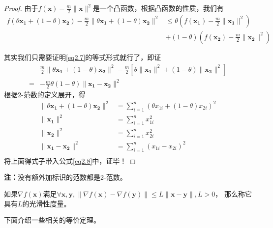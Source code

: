 \documentclass[lang=cn,10pt]{elegantbook}
\newcommand\bv[1]{\boldsymbol{#1}}
\begin{document}
\begin{proof}
	由于$f(\bv{x})-\frac{m}{2} \|\bv{x}\|^2$是一个凸函数，根据凸函数的性质，我们有
	\begin{equation}\label{eq2.6}
		\begin{aligned}
			f(\theta \bv{x_1}+(1-\theta)\bv{x_2})-\frac{m}{2} \|\theta \bv{x_1}+(1-\theta)\bv{x_2}\|^2 & \leq \theta (f(\bv{x_1})-\frac{m}{2} \|\bv{x_1}\|^2) \\
			                                                                                           & + (1-\theta)(f(\bv{x_2})-\frac{m}{2} \|\bv{x_2}\|^2)
		\end{aligned}
	\end{equation}

	其实我们只需要证明\ref{eq2.7}的等式形式就行了，即证
	\begin{equation} \label{eq2.8}
		\begin{aligned}
			  & \frac{m}{2} \|\theta \bv{x_1}+(1-\theta)\bv{x_2}\|^2 - \frac{m}{2}[\theta \|\bv{x_1}\|^2 + (1-\theta)\|\bv{x_2}\|^2] \\
			= & -\frac{m}{2}\theta(1-\theta)\|\bv{x_1-x_2}\|^2
		\end{aligned}
	\end{equation}
	根据2-范数的定义展开，得
	\begin{equation*}
		\begin{aligned}
			\|\theta \bv{x_1}+(1-\theta)\bv{x_2}\|^2 & = \sum_{i=1}^n (\theta x_{1i}+(1-\theta)x_{2i})^2 \\
			\|\bv{x_1}\|^2                           & =\sum_{i=1}^n x_{1i}^2                            \\
			\|\bv{x_2}\|^2                           & =\sum_{i=1}^n x_{2i}^2                            \\
			\|\bv{x_1}-\bv{x_2}\|^2                  & =\sum_{i=1}^n (x_{1i}-x_{2i})^2                   \\
		\end{aligned}
	\end{equation*}
	将上面得式子带入公式\ref{eq2.8}中，证毕！
\end{proof}
\textbf{注：}没有额外加标识的范数都是2-范数。

\begin{definition}[Smoothness]
	如果$\nabla f(\bv{x})$满足$\forall \bv{x,y},\|\nabla f(\bv{x})-\nabla f(\bv{y})\| \leq L\|\bv{x-y}\|,L > 0$，
	那么称它具有$L$的光滑性度量。
\end{definition}

下面介绍一些相关的等价定理。
\end{document}
